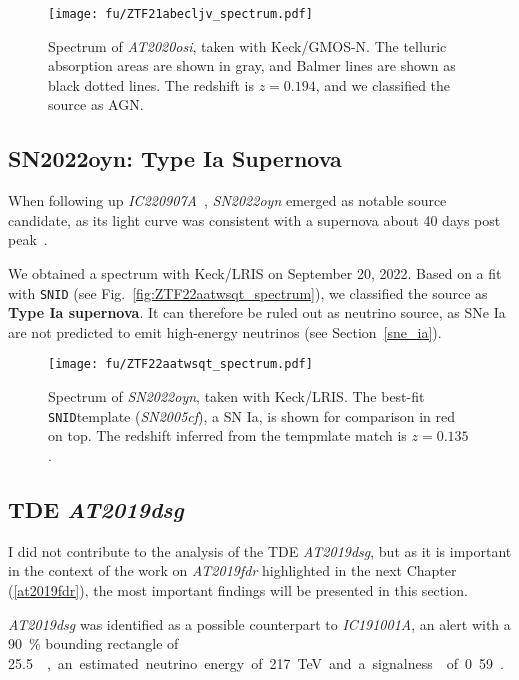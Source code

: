 \begin{figure}[htb]
    \texttt{[image: fu/ZTF21abecljv\_spectrum.pdf]}
    \caption[\emph{AT2020osi} spectrum]{Spectrum of \emph{AT2020osi}, taken with Keck/GMOS-N. The telluric absorption areas are shown in gray, and Balmer lines are shown as black dotted lines. The redshift is $z= 0.194$, and we classified the source as AGN.}
\end{figure}


\subsection{SN2022oyn: Type Ia Supernova}
When following up \emph{IC220907A}~, \emph{SN2022oyn} emerged as notable source candidate, as its light curve was consistent with a supernova about 40 days post peak~.

We obtained a spectrum with Keck/LRIS on September 20, 2022. Based on a fit with \texttt{SNID} (see Fig.~\ref{fig:ZTF22aatwsqt_spectrum}), we classified the source as \textbf{Type Ia supernova}. It can therefore be ruled out as neutrino source, as SNe Ia are not predicted to emit high-energy neutrinos (see Section~\ref{sne_ia}).

\begin{figure}[htb]
    \texttt{[image: fu/ZTF22aatwsqt\_spectrum.pdf]}
    \caption[\emph{SN2022oyn} spectrum]{Spectrum of \emph{SN2022oyn}, taken with Keck/LRIS. The best-fit \texttt{SNID}template (\emph{SN2005cf}), a SN Ia, is shown for comparison in red on top. The redshift inferred from the tempmlate match is $z=0.135$.}
\end{figure}

\subsection{TDE \emph{AT2019dsg}}\label{at2019dsg}
I did not contribute to the analysis of the TDE \emph{AT2019dsg}, but as it is important in the context of the work on \emph{AT2019fdr} highlighted in the next Chapter (\ref{at2019fdr}), the most important findings will be presented in this section.

\emph{AT2019dsg} was identified as a possible counterpart to \emph{IC191001A}, an alert with a \SI{90}{\percent} bounding rectangle of \SI{25.5}{\square\deg}, an estimated neutrino energy of \SI{217}{\tera\eV} and a signalness of 0.59~.

